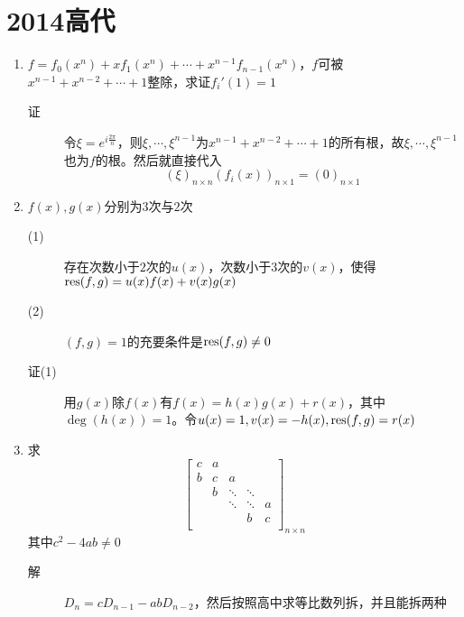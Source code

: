 \section{2014高代}
\begin{enumerate}
\item $f=f_0(x^n)+xf_1(x^n)+\cdots+x^{n-1}f_{n-1}(x^n)$，$f$可被$x^{n-1}+x^{n-2}+\cdots+1$整除，求证$f_i'(1)=1$
\begin{description}
\item[证] 令$\xi= e^{i\frac{2\pi}{n}}$，则$\xi,\cdots,\xi^{n-1}$为$x^{n-1}+x^{n-2}+\cdots+1$的所有根，故$\xi,\cdots,\xi^{n-1}$也为$f$的根。然后就直接代入
\[
(\xi)_{n\times n}(f_i(x))_{n\times 1}=(0)_{n\times 1}
\]
\end{description}
\item $f(x),g(x)$分别为$3$次与$2$次
\begin{description}
\item[(1)] 存在次数小于$2$次的$u(x)$，次数小于$3$次的$v(x)$，使得$\operatorname{res}(f,g)=u(x)f(x)+v(x)g(x)$
\item[(2)] $(f,g)=1$的充要条件是$\operatorname{res}(f,g)\neq 0$
\item[证(1)] 用$g(x)$除$f(x)$有$f(x) = h(x)g(x)+r(x)$，其中$\deg(h(x)) = 1$。令$u(x)=1,v(x)=-h(x),\operatorname{res}(f,g) = r(x)$
\end{description}

\item 求
\[
\left[
\begin{array}{ccccc}
c & a & & & \\
b & c & a & & \\
 & b & \ddots & \ddots & \\
 & & \ddots & \ddots & a \\
 & & & b & c \\
\end{array}\right]_{n\times n}
\]
其中$c^2 - 4ab \neq 0$
\begin{description}
\item[解] $D_n = cD_{n-1} - abD_{n-2}$，然后按照高中求等比数列拆，并且能拆两种
\end{description}



\end{enumerate}
